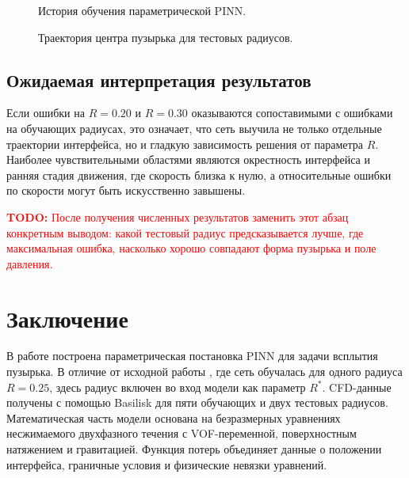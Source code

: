 \documentclass[12pt,a4paper]{article}
\newcommand{\todo}[1]{%
    \par\noindent\textcolor{red}{\textbf{TODO:} #1}\par
}
\begin{document}
\begin{figure}[h]
    \centering
    \caption{История обучения параметрической PINN.}
    \label{fig:loss_history}
\end{figure}

\begin{figure}[h]
    \centering
    \caption{Траектория центра пузырька для тестовых радиусов.}
    \label{fig:center_of_mass}
\end{figure}

\subsection{Ожидаемая интерпретация результатов}

Если ошибки на \(R=0.20\) и \(R=0.30\) оказываются сопоставимыми с ошибками на
обучающих радиусах, это означает, что сеть выучила не только отдельные
траектории интерфейса, но и гладкую зависимость решения от параметра \(R\).
Наиболее чувствительными областями являются окрестность интерфейса и ранняя
стадия движения, где скорость близка к нулю, а относительные ошибки по скорости
могут быть искусственно завышены.

\todo{После получения численных результатов заменить этот абзац конкретным
выводом: какой тестовый радиус предсказывается лучше, где максимальная ошибка,
насколько хорошо совпадают форма пузырька и поле давления.}

\section{Заключение}

В работе построена параметрическая постановка PINN для задачи всплытия пузырька.
В отличие от исходной работы \cite{Buhendwa2021}, где сеть обучалась для одного
радиуса \(R=0.25\), здесь радиус включен во вход модели как параметр \(R^*\).
CFD-данные получены с помощью Basilisk для пяти обучающих и двух тестовых
радиусов. Математическая часть модели основана на безразмерных уравнениях
несжимаемого двухфазного течения с VOF-переменной, поверхностным натяжением и
гравитацией. Функция потерь объединяет данные о положении интерфейса,
граничные условия и физические невязки уравнений.
\end{document}
